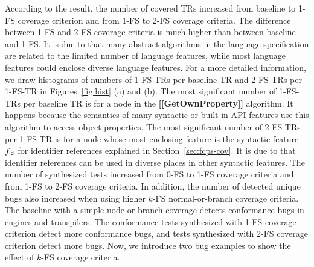 
According to the result, the number of covered TRs increased  from baseline to 1-FS coverage criterion and  from 1-FS to 2-FS coverage criteria.
%
The difference between 1-FS and 2-FS coverage criteria is much higher than
between baseline and 1-FS.
%
It is due to that many abstract algorithms in the language specification are
related to the limited number of language features, while most language features
could enclose diverse language features.
%
For a more detailed information, we draw histograms of numbers of 1-FS-TRs per
baseline TR and 2-FS-TRs per 1-FS-TR in Figures~\ref{fig:hist} (a) and (b).
%
The most significant number of 1-FS-TRs per baseline TR is  for a
node in the \textbf{[[GetOwnProperty]]} algorithm.
%
It happens because the semantics of many syntactic or built-in API features use
this algorithm to access object properties.
%
The most significant number of 2-FS-TRs per 1-FS-TR is  for a node
whose most enclosing feature is the syntactic feature $f_{\textsf{id}}$ for identifier
references explained in Section~\ref{sec:fcps-cov}.
%
It is due to that identifier references can be used in diverse places in other
syntactic features.
%
The number of synthesized tests increased  from
0-FS to 1-FS coverage criteria and  from 1-FS to
2-FS coverage criteria.
%
In addition, the number of detected unique bugs also increased when using higher
$k$-FS normal-or-branch coverage criteria.
%
The baseline with a simple node-or-branch coverage detects 
conformance bugs in engines and transpilers.
%
The conformance tests synthesized with 1-FS coverage criterion detect  more conformance bugs, and tests synthesized with 2-FS coverage
criterion detect  more bugs.
%
Now, we introduce two bug examples to show the effect of $k$-FS coverage
criteria.


